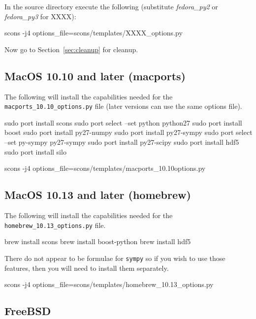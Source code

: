 \documentclass{esysdoc}
\begin{document}
\noindent In the source directory execute the following (substitute \textit{fedora_py2} or \textit{fedora_py3} for XXXX):
\begin{shellCode}
scons -j4 options_file=scons/templates/XXXX_options.py
\end{shellCode}

\noindent Now go to Section~\ref{sec:cleanup} for cleanup.

\subsection{MacOS 10.10 and later (macports)}\label{sec:macportsrc}

The following will install the capabilities needed for the \texttt{macports_10.10_options.py} file (later versions can use the same options file).

\begin{shellCode}
sudo port install scons
sudo port select --set python python27
sudo port install boost
sudo port install py27-numpy
sudo port install py27-sympy
sudo port select --set py-sympy py27-sympy
sudo port install py27-scipy
sudo port install hdf5
sudo port install silo
\end{shellCode}

\begin{shellCode}
scons -j4 options_file=scons/templates/macports_10.10options.py
\end{shellCode}


\subsection{MacOS 10.13 and later (homebrew)}\label{sec:homebrewsrc}

The following will install the capabilities needed for the \texttt{homebrew_10.13_options.py} file.

\begin{shellCode}
brew install scons
brew install boost-python
brew install hdf5
\end{shellCode}

There do not appear to be formulae for \texttt{sympy}  so if you wish to use those features, then
you will need to install them separately.


\begin{shellCode}
scons -j4 options_file=scons/templates/homebrew_10.13_options.py
\end{shellCode}


\subsection{FreeBSD}\label{sec:freebsdsrc}
\end{document}
